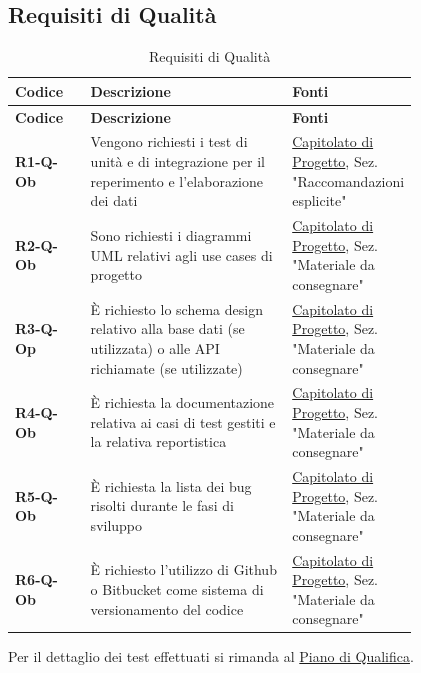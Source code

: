 \documentclass[a4paper,12pt]{article}
\begin{document}
{        \subsection{Requisiti di Qualità} {
            \begin{longtable}{|l|P{0.5\linewidth}|P{0.3\linewidth}|}
                \caption{Requisiti di Qualità} \\
                
                \hline
                \textbf{Codice} & \textbf{Descrizione} & \textbf{Fonti} \\
                \hline
                \endfirsthead
                
                \hline
                \textbf{Codice} & \textbf{Descrizione} & \textbf{Fonti} \\
                \hline
                \endhead

                \textbf{R1-Q-Ob} & Vengono richiesti i test di unità e di integrazione per il reperimento e l’elaborazione dei dati & \hyperlink{capitolato}{Capitolato di Progetto}, \newline 
                Sez. "Raccomandazioni esplicite" \\
                \hline
                \textbf{R2-Q-Ob} & Sono richiesti i diagrammi UML relativi agli use cases di progetto & \hyperlink{capitolato}{Capitolato di Progetto}, \newline 
                Sez. "Materiale da consegnare" \\
                \hline
                \textbf{R3-Q-Op} & È richiesto lo schema design relativo alla base dati (se utilizzata) o alle API richiamate (se utilizzate) & \hyperlink{capitolato}{Capitolato di Progetto}, \newline 
                Sez. "Materiale da consegnare" \\
                \hline
                \textbf{R4-Q-Ob} & È richiesta la documentazione relativa ai casi di test gestiti e la relativa reportistica & \hyperlink{capitolato}{Capitolato di Progetto}, \newline 
                Sez. "Materiale da consegnare" \\
                \hline
                \textbf{R5-Q-Ob} & È richiesta la lista dei bug risolti durante le fasi di sviluppo & \hyperlink{capitolato}{Capitolato di Progetto}, \newline 
                Sez. "Materiale da consegnare" \\
                \hline
                \textbf{R6-Q-Ob} & È richiesto l'utilizzo di Github o Bitbucket come sistema di versionamento del codice & \hyperlink{capitolato}{Capitolato di Progetto}, \newline 
                Sez. "Materiale da consegnare" \\
                \hline
            \end{longtable}
            Per il dettaglio dei test effettuati si rimanda al \href{https://team-three-technologies.github.io/Documenti/2%20-%20PB/Documenti%20esterni/Piano_di_Qualifica_v2_0.pdf}{Piano di Qualifica}.
        }
}
\end{document}
